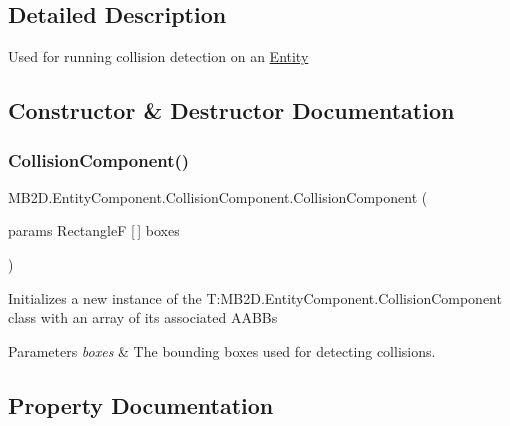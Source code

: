 \subsection{Detailed Description}
Used for running collision detection on an \hyperlink{class_m_b2_d_1_1_entity_component_1_1_entity}{Entity} 



\subsection{Constructor \& Destructor Documentation}
\hypertarget{class_m_b2_d_1_1_entity_component_1_1_collision_component_a6367fc81a9baf226bdd98cdc5814f5ac}{}\label{class_m_b2_d_1_1_entity_component_1_1_collision_component_a6367fc81a9baf226bdd98cdc5814f5ac} 
\subsubsection{\texorpdfstring{Collision\+Component()}{CollisionComponent()}}
{\footnotesize\ttfamily M\+B2\+D.\+Entity\+Component.\+Collision\+Component.\+Collision\+Component (\begin{DoxyParamCaption}\item[{params RectangleF \mbox{[}$\,$\mbox{]}}]{boxes }\end{DoxyParamCaption})\hspace{0.3cm}{\ttfamily [inline]}}



Initializes a new instance of the T\+:\+M\+B2\+D.\+Entity\+Component.\+Collision\+Component class with an array of its associated A\+A\+BB\textquotesingle{}s 


\begin{DoxyParams}{Parameters}
{\em boxes} & The bounding boxes used for detecting collisions.\\
\hline
\end{DoxyParams}


\subsection{Property Documentation}
\hypertarget{class_m_b2_d_1_1_entity_component_1_1_collision_component_a1cc63c601df7e30ce5b63e50b487dc9e}{}\label{class_m_b2_d_1_1_entity_component_1_1_collision_component_a1cc63c601df7e30ce5b63e50b487dc9e} 
